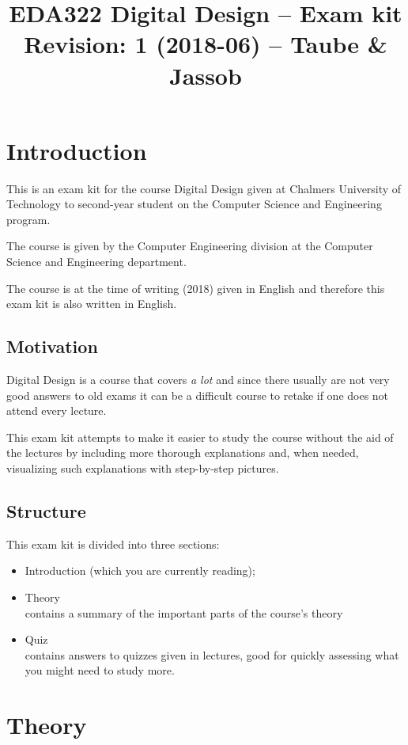 \documentclass[a4paper,11pt]{report}
\title{EDA322 Digital Design -- Exam kit \\
  \small Revision: 1 (2018-06) -- Taube \& Jassob
}
\begin{document}
\maketitle
\tableofcontents

\newpage

\chapter{Introduction}
This is an exam kit for the course Digital Design given at Chalmers
University of Technology to second-year student on the Computer
Science and Engineering program.

The course is given by the Computer Engineering division at the
Computer Science and Engineering department.

The course is at the time of writing (2018) given in English and
therefore this exam kit is also written in English.

\section{Motivation}
Digital Design is a course that covers \textit{a lot} and since there
usually are not very good answers to old exams it can be a difficult
course to retake if one does not attend every lecture.

This exam kit attempts to make it easier to study the course without
the aid of the lectures by including more thorough explanations and,
when needed, visualizing such explanations with step-by-step pictures.

\section{Structure}

This exam kit is divided into three sections:
\begin{itemize}
\item Introduction (which you are currently reading);
\item Theory \\
  contains a summary of the important parts of the course's theory
\item Quiz \\
  contains answers to quizzes given in lectures, good for quickly
  assessing what you might need to study more.
\end{itemize}

\newpage

\chapter{Theory}
\end{document}
